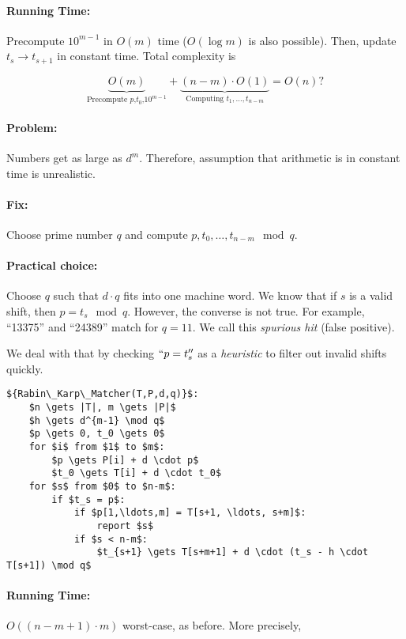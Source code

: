 \paragraph{Running Time:} Precompute $10^{m-1}$ in $O(m)$ time ($O(\log m)$ is also possible). Then, update $t_s \rightarrow t_{s+1}$ in constant time. Total complexity is

$$\underbrace{O(m)}_\text{Precompute $p$,$t_0$,$10^{m-1}$} + \underbrace{(n-m) \cdot O(1)}_\text{Computing $t_1, \ldots, t_{n-m}$} = O(n)?$$

\paragraph{Problem:} Numbers get as large as $d^m$. Therefore, assumption that arithmetic is in constant time is unrealistic.

\paragraph{Fix:} Choose prime number $q$ and compute $p, t_0, \ldots, t_{n-m} \mod q$.

\paragraph{Practical choice:} Choose $q$ such that $d \cdot q$ fits into one machine word. We know that if $s$ is a valid shift, then $p = t_s \mod q$. However, the converse is not true. For example, ``13375'' and ``24389'' match for $q=11$. We call this \emph{spurious hit} (false positive).

We deal with that by checking $``p=t_s''$ as a \emph{heuristic} to filter out invalid shifts quickly.

\begin{lstlisting}[mathescape]
${Rabin\_Karp\_Matcher(T,P,d,q)}$:
	$n \gets |T|, m \gets |P|$
	$h \gets d^{m-1} \mod q$
	$p \gets 0, t_0 \gets 0$
	for $i$ from $1$ to $m$:
		$p \gets P[i] + d \cdot p$
		$t_0 \gets T[i] + d \cdot t_0$
	for $s$ from $0$ to $n-m$:
		if $t_s = p$:
			if $p[1,\ldots,m] = T[s+1, \ldots, s+m]$:
				report $s$
			if $s < n-m$:
				$t_{s+1} \gets T[s+m+1] + d \cdot (t_s - h \cdot T[s+1]) \mod q$
\end{lstlisting}

\paragraph{Running Time:} $O((n-m+1) \cdot m)$ worst-case, as before. More precisely,

